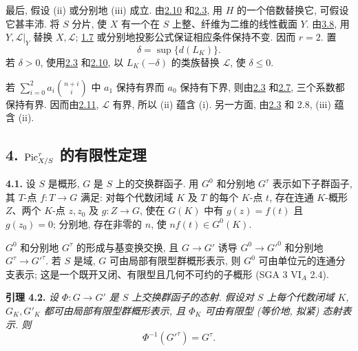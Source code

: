 最后, 假设 (ii) 或分别地 (iii) 成立. 由\hyperlink{sga6.e13.rem.2-10}{2.10} 和\hyperlink{sga6.e13.lem.2-3}{2.3}, 用 \(H\) 的一个倍数替换它, 可假设它甚丰沛. 将 \(S\) 分片, 使 \(X\) 有一个在 \(S\) 上整、纤维为二维的线性截面 \(Y\). 由\hyperlink{sga6.e13.thm.3-8}{3.8}, 用 \(Y,\mathscr L|_Y\) 替换 \(X,\mathscr L\); \hyperlink{sga6.e13.lem.1-7}{1.7} 或分别地投影公式保证相应条件保持不变. 因而 \(r=2\). 置
\[
\delta=\sup\{d(L_K)\}.
\]
若 \(\delta>0\), 使用\hyperlink{sga6.e13.lem.2-3}{2.3} 和\hyperlink{sga6.e13.rem.2-10}{2.10}, 以 \(L_K(-\delta)\) 的类族替换 \(\mathscr L\), 使 \(\delta\le0\).

若 \(\sum_{i=0}^{2}a_i\binom{n+i}{i}\) 中 \(a_1\) 保持有界而 \(a_0\) 保持有下界, 则由\hyperlink{sga6.e13.lem.2-3}{2.3} 和\hyperlink{sga6.e13.lem.2-6}{2.7}, 三个系数都保持有界. 因而由\hyperlink{sga6.e13.lem.2-11}{2.11}, \(\mathscr L\) 有界, 所以 (ii) 蕴含 (i). 另一方面, 由\hyperlink{sga6.e13.lem.2-3}{2.3} 和 2.8, (iii) 蕴含 (ii).

\subsection*{4. \(\operatorname{Pic}^\tau_{X/S}\) 的有限性定理}

\textbf{4.1.} 设 \(S\) 是概形, \(G\) 是 \(S\) 上的交换群函子. 用 \(G^0\) 和分别地 \(G^\tau\) 表示如下子群函子, 其 \(T\)-点 \(f:T\to G\) 满足: 对每个代数闭域 \(K\) 及 \(T\) 的每个 \(K\)-点 \(t\), 存在连通 \(K\)-概形 \(Z\)、两个 \(K\)-点 \(z,z_0\) 及 \(g:Z\to G\), 使在 \(G(K)\) 中有 \(g(z)=f(t)\) 且 \(g(z_0)=0\); 分别地, 存在非零的 \(n\), 使 \(nf(t)\in G^0(K)\).

\(G^0\) 和分别地 \(G^\tau\) 的形成与基变换交换, 且 \(G\to G'\) 诱导 \(G^0\to G'^0\) 和分别地 \(G^\tau\to G'^\tau\). 若 \(S\) 是域, \(G\) 可由局部有限型群概形表示, 则 \(G^0\) 可由单位元的连通分支表示; 这是一个既开又闭、有限型且几何不可约的子概形 (SGA 3 VI\(_A\) 2.4).

\textbf{引理 4.2.} \emph{设 \(\Phi:G\to G'\) 是 \(S\) 上交换群函子的态射. 假设对 \(S\) 上每个代数闭域 \(K\), \(G_K,G'_K\) 都可由局部有限型群概形表示, 且 \(\Phi_K\) 可由有限型 (等价地, 拟紧) 态射表示. 则}
\[
\Phi^{-1}(G'^\tau)=G^\tau.
\]

